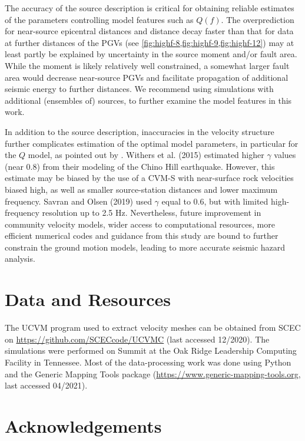 The accuracy of the source description is critical for obtaining reliable estimates of the parameters controlling model features such as $Q(f)$. The overprediction for near-source epicentral distances and distance decay faster than that for data at further distances of the PGVs (see \cref{fig:highf-8,fig:highf-9,fig:highf-12}) may at least partly be explained by uncertainty in the source moment and/or fault area. While the moment is likely relatively well constrained, a somewhat larger fault area  would decrease near-source PGVs and facilitate propagation of additional seismic energy to further distances. We recommend using simulations with additional (ensembles of) sources, to further examine the model features in this work.


In addition to the source description, inaccuracies in the velocity structure further complicates estimation of the optimal model parameters, in particular for the $Q$ model, as pointed out by . Withers et al. (2015) estimated higher $\gamma$ values (near 0.8) from their modeling of the Chino Hill earthquake. However, this estimate may be biased by the use of a CVM-S with near-surface rock velocities biased high, as well as smaller source-station distances and lower maximum frequency. Savran and Olsen (2019) used $\gamma$ equal to 0.6, but with limited high-frequency resolution up to 2.5 Hz. 
Nevertheless, future improvement in community velocity models, wider access to computational resources, more efficient numerical codes and guidance from this study are bound to further constrain the ground motion models, leading to more accurate seismic hazard analysis.


\section*{Data and Resources}
The UCVM program used to extract velocity meshes can be obtained from SCEC on \url{https://github.com/SCECcode/UCVMC} (last accessed 12/2020). The simulations were performed on Summit at the Oak Ridge Leadership Computing Facility in Tennessee. Most of the data-processing work was done using Python and the Generic Mapping Tools package (\url{https://www.generic-mapping-tools.org}, last accessed 04/2021).


\section*{Acknowledgements}


